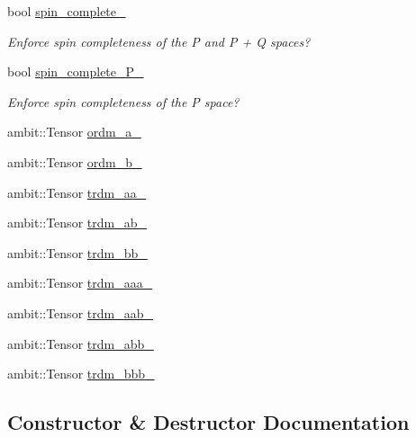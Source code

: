 \begin{DoxyCompactItemize}
bool \mbox{\hyperlink{classforte_1_1_selected_c_i_method_a9cdbe6e2e2c25c4ae139fd007fbaf4fa}{spin\+\_\+complete\+\_\+}}
\begin{DoxyCompactList}\small\item\em Enforce spin completeness of the P and P + Q spaces? \end{DoxyCompactList}\item 
bool \mbox{\hyperlink{classforte_1_1_selected_c_i_method_a08deebd30db8c7dfed25759e6c5e7261}{spin\+\_\+complete\+\_\+\+P\+\_\+}}
\begin{DoxyCompactList}\small\item\em Enforce spin completeness of the P space? \end{DoxyCompactList}\item 
ambit\+::\+Tensor \mbox{\hyperlink{classforte_1_1_selected_c_i_method_aff59fbfd7136464dcfa1d520c1c85057}{ordm\+\_\+a\+\_\+}}
\item 
ambit\+::\+Tensor \mbox{\hyperlink{classforte_1_1_selected_c_i_method_aab325341dd52e80c534094aedac6539b}{ordm\+\_\+b\+\_\+}}
\item 
ambit\+::\+Tensor \mbox{\hyperlink{classforte_1_1_selected_c_i_method_a566d368ab5f0361583d3d52ebde8b406}{trdm\+\_\+aa\+\_\+}}
\item 
ambit\+::\+Tensor \mbox{\hyperlink{classforte_1_1_selected_c_i_method_afc794ec24ad6fce27236ba0ad16c11f7}{trdm\+\_\+ab\+\_\+}}
\item 
ambit\+::\+Tensor \mbox{\hyperlink{classforte_1_1_selected_c_i_method_a23c867f7af0a92553d927d1e937e5f16}{trdm\+\_\+bb\+\_\+}}
\item 
ambit\+::\+Tensor \mbox{\hyperlink{classforte_1_1_selected_c_i_method_a245a37975dfe401f0212074b6051f6c4}{trdm\+\_\+aaa\+\_\+}}
\item 
ambit\+::\+Tensor \mbox{\hyperlink{classforte_1_1_selected_c_i_method_a3397c78c8ba79ef2119631055033013a}{trdm\+\_\+aab\+\_\+}}
\item 
ambit\+::\+Tensor \mbox{\hyperlink{classforte_1_1_selected_c_i_method_a7fa32d83628a8b47165208002e69c8ad}{trdm\+\_\+abb\+\_\+}}
\item 
ambit\+::\+Tensor \mbox{\hyperlink{classforte_1_1_selected_c_i_method_ad143fd6e0b3a2df4fb433a63528db6de}{trdm\+\_\+bbb\+\_\+}}
\end{DoxyCompactItemize}


\subsection{Constructor \& Destructor Documentation}
\mbox{\label{classforte_1_1_selected_c_i_method_a3062204ea433444c4a8f5c0cfcfb5779}} 
